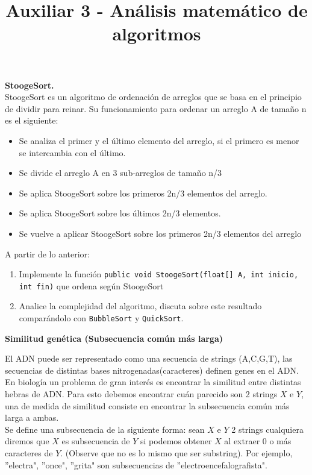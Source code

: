 \documentclass[dcc]{fcfmcourse}
\title{Auxiliar 3 - Análisis matemático de algoritmos}
\begin{document}
\maketitle

\vspace{-1ex}

\begin{problems}
\problem \textbf{StoogeSort.}\\
StoogeSort es un algoritmo de ordenación de arreglos que se basa en el principio de dividir para reinar. Su funcionamiento para ordenar un arreglo A de tamaño n es el siguiente: 

\begin{itemize}
    \item Se analiza el primer y el último elemento del arreglo, si el primero es menor se intercambia con el último.
    \item Se divide el arreglo A en 3 sub-arreglos de tamaño n/3
    \item Se aplica StoogeSort sobre los primeros 2n/3 elementos del arreglo.
    \item Se aplica StoogeSort sobre los últimos 2n/3 elementos.
    \item Se vuelve a aplicar StoogeSort sobre los primeros 2n/3 elementos del arreglo
\end{itemize}

A partir de lo anterior:

\begin{enumerate}
    \item Implemente la función \texttt{public void StoogeSort(float[] A, int inicio, int fin)} que ordena según StoogeSort
    \item Analice la complejidad del algoritmo, discuta sobre este resultado comparándolo con \texttt{BubbleSort} y \texttt{QuickSort}.
\end{enumerate}

\problem \textbf{Similitud genética (Subsecuencia común más larga)}

El ADN puede ser representado como una secuencia de strings (A,C,G,T), las secuencias de distintas bases nitrogenadas(caracteres) definen genes en el ADN. En biología un problema de gran interés es encontrar la similitud entre distintas hebras de ADN. Para esto debemos encontrar cuán parecido son 2 strings $X$ e $Y$, una de medida de similitud consiste en encontrar la subsecuencia común más larga a ambas. \\

Se define una subsecuencia de la siguiente forma: sean $X$ e $Y$ 2 strings cualquiera diremos que $X$ es subsecuencia de $Y$ si podemos obtener $X$ al extraer 0 o más caracteres de $Y$. (Observe que no es lo mismo que ser substring). Por ejemplo, ''electra", ''once", ''grita" son subsecuencias de ''electroencefalografista".\\


\end{problems}
\end{document}
